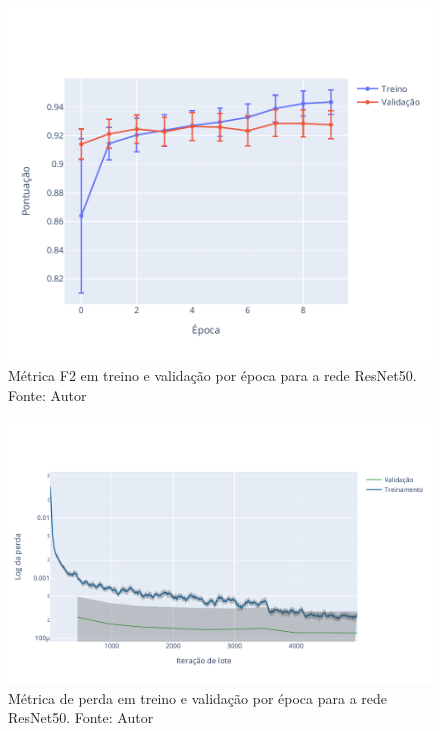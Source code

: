 \begin{figure}[!ht]
    \centering
    \includegraphics[width=\columnwidth]{Imagens/results/rsp-resnet-50_planet_pt/pontuação em treino e validação por época.pdf}
    \caption{ Métrica F2 em treino e validação por época para a rede ResNet50. Fonte: Autor}
    \label{fig:TreinoResnetScore}
\end{figure}  

\begin{figure}[!ht]
    \centering
    \includegraphics[width=\columnwidth]{Imagens/results/rsp-resnet-50_planet_pt/Training Loss Per Minibatch.pdf}
    \caption{ Métrica de perda em treino e validação por época para a rede ResNet50. Fonte: Autor}
    \label{fig:TreinoResnetPerda}
\end{figure}



